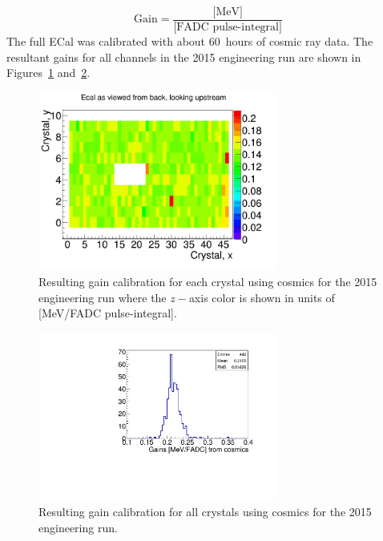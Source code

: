 \begin{equation}
	\label{eq:gain}
	\textrm{Gain} = \dfrac{\textrm{[MeV]}}{\textrm{[FADC pulse-integral]}} 
\end{equation}
The full ECal was calibrated with about 60~hours of cosmic ray data. The resultant gains for all channels in the 2015 engineering run are shown in Figures~\ref{Figure:cosmicG} and~\ref{Figure:cosmicGhisto}.

\begin{figure}[htb]
  \centering
      \includegraphics[width=0.7\textwidth]{pics/performance/cosmicGains2015.png}
  \caption[Resulting 2015 gain calibration in the ECal using cosmic ray muons shown by ECal module position]{Resulting gain calibration for each crystal using cosmics for the 2015 engineering run where the $z-$axis color is shown in units of [MeV/FADC pulse-integral].}
  \label{Figure:cosmicG}
\end{figure}


\begin{figure}[htb]
  \centering
      \includegraphics[width=0.7\textwidth]{pics/performance/cosmicGainsMay15.pdf}
  \caption[Distribution of the resulting 2015 gains in the ECal using cosmic ray muons]{Resulting gain calibration for all crystals using cosmics for the 2015 engineering run.}
  \label{Figure:cosmicGhisto}
\end{figure}

